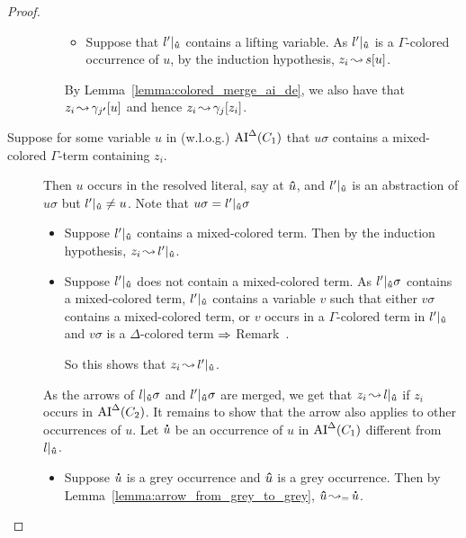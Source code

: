 \documentclass[,%
	paper=a4,%
	DIV10, %
	twoside=false,%
	liststotoc,
	bibtotoc,
	draft=false,%
	numbers=noendperiod
]{scrartcl}
\begin{document}
\begin{proof}
\begin{description}
\begin{itemize}
\begin{itemize}
						\item Suppose that $l'|_{\bm\hat u}$ contains a lifting variable.
							As $l'|_{\bm\hat u}$ is a $\Gamma$-colored occurrence of $u$, by the induction hypothesis, $z_i\operatorname{\leadsto} s[u]$.
					\end{itemize}

					By Lemma~\ref{lemma:colored_merge_ai_de}, we also have that $z_i\operatorname{\leadsto} \gamma_{j\bm '}[u]$ and hence $z_i \operatorname{\leadsto} \gamma_j[z_i]$.
			\end{itemize}



		\item[Suppose for some variable $u$ in (w.l.o.g.) $\operatorname{AI}^\Delta(C_1)$ that $u\sigma$ contains a mixed-colored $\Gamma$-term containing $z_i$.]
			Then $u$ occurs in the resolved literal, say at $\bm\hat u$, and $l'|_{\bm\hat u}$ is an abstraction of $u\sigma$ but $l'|_{\bm\hat u} \neq u$. 
			Note that $u\sigma = l'|_{\bm\hat u}\sigma$ 

			\begin{itemize}
				\item Suppose $l'|_{\bm\hat u}$ contains a mixed-colored term.
					Then by the induction hypothesis, $z_i \operatorname{\leadsto} l'|_{\bm\hat u}$.

				\item Suppose $l'|_{\bm\hat u}$ does not contain a mixed-colored term.
					As $l'|_{\bm\hat u}\sigma$ contains a mixed-colored term,
					$l'|_{\bm\hat u}$ contains a variable $v$ such that either $v\sigma$ contains a mixed-colored term, or $v$ occurs in a $\Gamma$-colored term in $l'|_{\bm\hat u}$ and $v\sigma$ is a $\Delta$-colored term
					$\Rightarrow$ Remark~\substremarkref.

					So this shows that $z_i \operatorname{\leadsto} l'|_{\bm\hat u}$. 
			\end{itemize}

			As the arrows of $l|_{\bm\hat u}\sigma$ and $l'|_{\bm\hat u}\sigma$ are merged, we get that $z_i \operatorname{\leadsto} l|_{\bm\hat u}$ if $z_i$ occurs in $\operatorname{AI}^\Delta(C_2)$.
			It remains to show that the arrow also applies to other occurrences of $u$.
			Let $\bm\dot u$ be an occurrence of $u$ in $\operatorname{AI}^\Delta(C_1)$ different from $l|_{\bm\hat u}$.
			\begin{itemize}
				\item Suppose $\bm\dot u$ is a grey occurrence and $\bm\hat u$ is a grey occurrence.
					Then by Lemma~\ref{lemma:arrow_from_grey_to_grey}, $\bm\hat u \operatorname{\leadsto_=} \bm\dot u$.


\end{itemize}
\end{description}
\end{proof}
\end{document}
